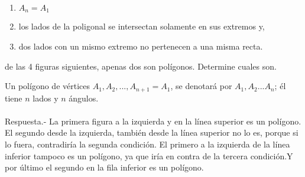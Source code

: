 \begin{enumerate}
\begin{enumerate}[\bfseries a)]
		\item $A_n=A_1$

		\item los lados de la poligonal se intersectan solamente en sus extremos y, 

		\item dos lados con un mismo extremo no pertenecen a una misma recta. 
	    \end{enumerate}
	de las 4 figuras siguientes, apenas dos son polígonos. Determine cuales son.

	    \begin{multicols}{2}
		\begin{center}
		    


		\end{center}
	    \end{multicols}
	    Un polígono de vértices $A_1,A_2,...,A_{n+1}=A_1$, se denotará por $A_1,A_2...A_n$; él tiene $n$ lados y $n$ ángulos.\\\\

	    Respuesta.-\; La primera figura a la izquierda y en la línea superior es un polígono. El segundo desde la izquierda, también desde la línea superior no lo es, porque si lo fuera, contradiría la segunda condición. El primero a la izquierda de la línea inferior tampoco es un polígono, ya que iría en contra de la tercera condición.Y por último el segundo en la fila inferior es un polígono.\\\\
 

\end{enumerate}
